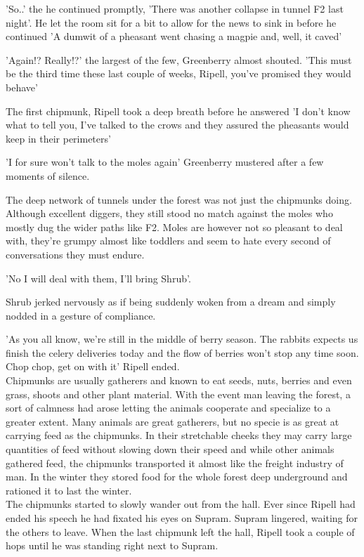 \documentclass[smalldemyvopaper,11pt,twoside,onecolumn,openright,extrafontsizes]{memoir}
\begin{document}
'So..' the he continued promptly, 'There was another collapse in tunnel F2 last night'. He let the room sit for a bit to allow for the news to sink in before he continued 'A dumwit of a pheasant went chasing a magpie and, well, it caved'

'Again!? Really!?' the largest of the few, Greenberry almost shouted. 
'This must be the third time these last couple of weeks, Ripell, you've promised they would behave'

The first chipmunk, Ripell took a deep breath before he answered
'I don't know what to tell you, I've talked to the crows and they assured the pheasants would keep in their perimeters'

'I for sure won't talk to the moles again' Greenberry mustered after a few moments of silence.

The deep network of tunnels under the forest was not just the chipmunks doing. Although excellent diggers, they still stood no match against the moles who mostly dug the wider paths like F2. Moles are however not so pleasant to deal with, they're grumpy almost like toddlers and seem to hate every second of conversations they must endure. 

'No I will deal with them, I'll bring Shrub'. 

Shrub jerked nervously as if being suddenly woken from a dream and simply nodded in a gesture of compliance. 

'As you all know, we're still in the middle of berry season. The rabbits expects us finish the celery deliveries today and the flow of berries won't stop any time soon. Chop chop, get on with it' Ripell ended. \\

Chipmunks are usually gatherers and known to eat seeds, nuts, berries and even grass, shoots and other plant material. With the event man leaving the forest, a sort of calmness had arose letting the animals cooperate and specialize to a greater extent. Many animals are great gatherers, but no specie is as great at carrying feed as the chipmunks. In their stretchable cheeks they may carry large quantities of feed without slowing down their speed and while other animals gathered feed, the chipmunks transported it almost like the freight industry of man. In the winter they stored food for the whole forest deep underground and rationed it to last the winter. \\

The chipmunks started to slowly wander out from the hall. Ever since Ripell had ended his speech he had fixated his eyes on Supram. Supram lingered, waiting for the others to leave. When the last chipmunk left the hall, Ripell took a couple of hops until he was standing right next to Supram.\\
\end{document}
